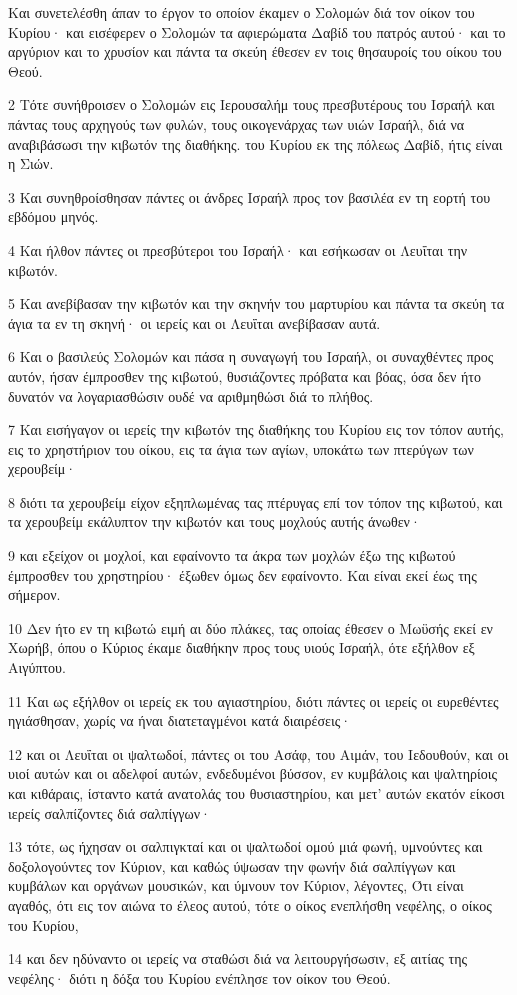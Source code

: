 \par Και συνετελέσθη άπαν το έργον το οποίον έκαμεν ο Σολομών διά τον οίκον του Κυρίου· και εισέφερεν ο Σολομών τα αφιερώματα Δαβίδ του πατρός αυτού· και το αργύριον και το χρυσίον και πάντα τα σκεύη έθεσεν εν τοις θησαυροίς του οίκου του Θεού.
\par 2 Τότε συνήθροισεν ο Σολομών εις Ιερουσαλήμ τους πρεσβυτέρους του Ισραήλ και πάντας τους αρχηγούς των φυλών, τους οικογενάρχας των υιών Ισραήλ, διά να αναβιβάσωσι την κιβωτόν της διαθήκης. του Κυρίου εκ της πόλεως Δαβίδ, ήτις είναι η Σιών.
\par 3 Και συνηθροίσθησαν πάντες οι άνδρες Ισραήλ προς τον βασιλέα εν τη εορτή του εβδόμου μηνός.
\par 4 Και ήλθον πάντες οι πρεσβύτεροι του Ισραήλ· και εσήκωσαν οι Λευΐται την κιβωτόν.
\par 5 Και ανεβίβασαν την κιβωτόν και την σκηνήν του μαρτυρίου και πάντα τα σκεύη τα άγια τα εν τη σκηνή· οι ιερείς και οι Λευΐται ανεβίβασαν αυτά.
\par 6 Και ο βασιλεύς Σολομών και πάσα η συναγωγή του Ισραήλ, οι συναχθέντες προς αυτόν, ήσαν έμπροσθεν της κιβωτού, θυσιάζοντες πρόβατα και βόας, όσα δεν ήτο δυνατόν να λογαριασθώσιν ουδέ να αριθμηθώσι διά το πλήθος.
\par 7 Και εισήγαγον οι ιερείς την κιβωτόν της διαθήκης του Κυρίου εις τον τόπον αυτής, εις το χρηστήριον του οίκου, εις τα άγια των αγίων, υποκάτω των πτερύγων των χερουβείμ·
\par 8 διότι τα χερουβείμ είχον εξηπλωμένας τας πτέρυγας επί τον τόπον της κιβωτού, και τα χερουβείμ εκάλυπτον την κιβωτόν και τους μοχλούς αυτής άνωθεν·
\par 9 και εξείχον οι μοχλοί, και εφαίνοντο τα άκρα των μοχλών έξω της κιβωτού έμπροσθεν του χρηστηρίου· έξωθεν όμως δεν εφαίνοντο. Και είναι εκεί έως της σήμερον.
\par 10 Δεν ήτο εν τη κιβωτώ ειμή αι δύο πλάκες, τας οποίας έθεσεν ο Μωϋσής εκεί εν Χωρήβ, όπου ο Κύριος έκαμε διαθήκην προς τους υιούς Ισραήλ, ότε εξήλθον εξ Αιγύπτου.
\par 11 Και ως εξήλθον οι ιερείς εκ του αγιαστηρίου, διότι πάντες οι ιερείς οι ευρεθέντες ηγιάσθησαν, χωρίς να ήναι διατεταγμένοι κατά διαιρέσεις·
\par 12 και οι Λευΐται οι ψαλτωδοί, πάντες οι του Ασάφ, του Αιμάν, του Ιεδουθούν, και οι υιοί αυτών και οι αδελφοί αυτών, ενδεδυμένοι βύσσον, εν κυμβάλοις και ψαλτηρίοις και κιθάραις, ίσταντο κατά ανατολάς του θυσιαστηρίου, και μετ' αυτών εκατόν είκοσι ιερείς σαλπίζοντες διά σαλπίγγων·
\par 13 τότε, ως ήχησαν οι σαλπιγκταί και οι ψαλτωδοί ομού μιά φωνή, υμνούντες και δοξολογούντες τον Κύριον, και καθώς ύψωσαν την φωνήν διά σαλπίγγων και κυμβάλων και οργάνων μουσικών, και ύμνουν τον Κύριον, λέγοντες, Ότι είναι αγαθός, ότι εις τον αιώνα το έλεος αυτού, τότε ο οίκος ενεπλήσθη νεφέλης, ο οίκος του Κυρίου,
\par 14 και δεν ηδύναντο οι ιερείς να σταθώσι διά να λειτουργήσωσιν, εξ αιτίας της νεφέλης· διότι η δόξα του Κυρίου ενέπλησε τον οίκον του Θεού.

